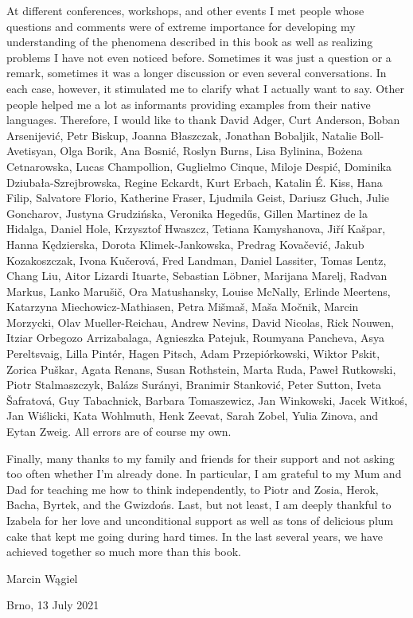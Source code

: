 At different conferences, workshops, and other events I met people whose questions and comments were of extreme importance for developing my understanding of the phenomena described in this book as well as realizing problems I have not even noticed before. Sometimes it was just a question or a remark, sometimes it was a longer discussion or even several conversations. In each case, however, it stimulated me to clarify what I actually want to say. Other people helped me a lot as informants providing examples from their native languages. Therefore, I would like to thank David Adger, Curt Anderson, Boban Arsenijević, Petr Biskup, Joanna Błaszczak, Jonathan Bobaljik, Natalie Boll-Avetisyan, Olga Borik, Ana Bosnić, Roslyn Burns, Lisa Bylinina, Bożena Cetnarowska, Lucas Champollion, Guglielmo Cinque, Miloje Despić, Dominika Dziubała-Szrejbrowska, Regine Eckardt, Kurt Erbach, Katalin É. Kiss, Hana Filip, Salvatore Florio, Katherine Fraser, Ljudmila Geist, Dariusz Głuch, Julie Goncharov, Justyna Grudzińska, Veronika Hegedűs, Gillen Martinez de la Hidalga, Daniel Hole, Krzysztof Hwaszcz, Tetiana Kamyshanova, Jiří Kašpar, Hanna Kędzierska, Dorota Klimek-Jankowska, Predrag Kovačević, Jakub Kozakoszczak, Ivona Kučerová, Fred Landman, Daniel Lassiter, Tomas Lentz, Chang Liu, Aitor Lizardi Ituarte, Sebastian Löbner, Marijana Marelj, Radvan Markus, Lanko Marušič, Ora Matushansky, Louise McNally, Erlinde Meertens, Katarzyna Miechowicz-Mathiasen, Petra Mišmaš, Maša Močnik, Marcin Morzycki, Olav Mueller-Reichau, Andrew Nevins, David Nicolas, Rick Nouwen, Itziar Orbegozo Arrizabalaga, Agnieszka Patejuk, Roumyana Pancheva, Asya Pereltsvaig, Lilla Pintér, Hagen Pitsch, Adam Przepiórkowski, Wiktor Pskit, Zorica Puškar, Agata Renans, Susan Rothstein, Marta Ruda, Paweł Rutkowski, Piotr Stalmaszczyk, Balázs Surányi, Branimir Stanković, Peter Sutton, Iveta Šafratová, Guy Tabachnick, Barbara Tomaszewicz, Jan Winkowski, Jacek Witkoś, Jan Wiślicki, Kata Wohlmuth, Henk Zeevat, Sarah Zobel, Yulia Zinova, and Eytan Zweig. All errors are of course my own.

Finally, many thanks to my family and friends for their support and not asking too often whether I'm already done. In particular, I am grateful to my Mum and Dad for teaching me how to think independently, to Piotr and Zosia, Herok, Bacha, Byrtek, and the Gwizdońs. Last, but not least, I am deeply thankful to Izabela for her love and unconditional support as well as tons of delicious plum cake that kept me going during hard times. In the last several years, we have achieved together so much more than this book.

\null

\hfill Marcin Wągiel

\hfill Brno, 13 July 2021

 
 


